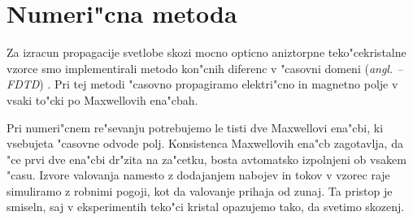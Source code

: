 \documentclass[12pt,twoside,openright,final,a4paper]{report}
\newcommand{\todo}[1]{(\textbf{\textsmaller{TODO}: #1})}
\newcommand{\angl}[1]{(\textit{angl. #1})}
\renewcommand{\acf}[1]{\aclu{#1} -- \acs{#1}}
\begin{document}

\chapter{Numeri"cna metoda}

Za izracun propagacije svetlobe skozi mocno opticno aniztorpne teko"cekristalne vzorce smo implementirali metodo kon"cnih diferenc v "casovni domeni \angl{\acf{FDTD}} \cite{taflove}. 
Pri tej metodi "casovno propagiramo elektri"cno in magnetno polje v vsaki to"cki po Maxwellovih ena"cbah. 

Pri numeri"cnem re"sevanju potrebujemo le tisti dve Maxwellovi ena"cbi, ki vsebujeta "casovne odvode polj. 
Konsistenca Maxwellovih ena"cb zagotavlja, da "ce prvi dve ena"cbi dr"zita na za"cetku, bosta avtomatsko izpolnjeni ob vsakem "casu\cite{taflove}. 
Izvore valovanja namesto z dodajanjem nabojev in tokov v vzorec raje simuliramo z robnimi pogoji, kot da valovanje prihaja od zunaj. 
Ta pristop je smiseln, saj v eksperimentih teko"ci kristal opazujemo tako, da svetimo skozenj. 
\end{document}
